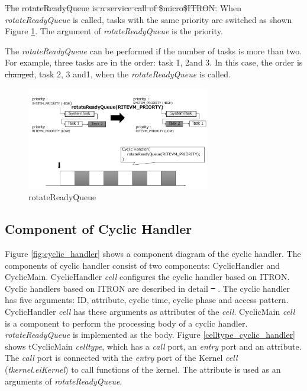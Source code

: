 \documentclass[conference,compsoc]{IEEEtran}
\providecommand{\DIFadd}[1]{{\protect\color{blue}\uwave{#1}}} %
\providecommand{\DIFdel}[1]{{\protect\color{red}\sout{#1}}}                      %
\providecommand{\DIFaddbegin}{} %
\providecommand{\DIFaddend}{} %
\providecommand{\DIFdelbegin}{} %
\providecommand{\DIFdelend}{} %
\begin{document}
\DIFdelbegin \DIFdel{The }%
\DIFdel{rotateReadyQueue}%
\DIFdel{is a service call of \$micro\$ITRON.
}\DIFdelend When {\it rotateReadyQueue} is called, tasks with the same priority are switched as shown \DIFaddbegin \DIFadd{in }\DIFaddend Figure \ref{fig:rotateReadyQueue}.
The argument of {\it rotateReadyQueue} is the priority.

The {\it rotateReadyQueue} can be performed if the number of tasks is more than two.
For example, three tasks are in the order: task 1, 2\DIFaddbegin \DIFadd{, }\DIFaddend and 3.
In this case, the order is \DIFdelbegin \DIFdel{changed}\DIFdelend \DIFaddbegin \DIFadd{rotated}\DIFaddend , task 2, 3 and\DIFaddbegin \DIFadd{, }\DIFaddend 1, when the {\it rotateReadyQueue} is called.

\begin{figure}[t]
    \centering
    \includegraphics[width=8cm,clip]{figure/rotateReadyQueue.pdf}
    \caption{rotateReadyQueue}
    \label{fig:rotateReadyQueue}
\end{figure}

\subsection{Component of Cyclic Handler}
Figure \ref{fig:cyclic_handler} shows a component diagram of the cyclic handler.
The components of cyclic handler consist of two components: CyclicHandler and CyclicMain.
CyclicHandler {\it cell} configures the cyclic handler based on \DIFaddbegin \DIFadd{$\mu$}\DIFaddend ITRON.
Cyclic handlers based on ITRON are described in detail \DIFdelbegin \DIFdel{\mbox{%
\cite{ITRON_spec}}%
}\DIFdelend \DIFaddbegin \DIFadd{\mbox{%
\cite{par:microITRON}}%
}\DIFaddend .
The cyclic handler has five arguments: ID, attribute, cyclic time, cyclic phase and access pattern.
CyclicHandler {\it cell} has these arguments as attributes of the {\it cell}.
CyclicMain {\it cell} is a component to perform the processing body of a cyclic handler.
{\it rotateReadyQueue} is implemented as the body.
Figure \ref{celltype_cyclic_handler} shows tCyclicMain {\it celltype}, which has a {\it call} port, an {\it entry} port and an attribute.
The {\it call} port is connected with the {\it entry} port of the Kernel {\it cell} ({\it tkernel.eiKernel}) to call functions of the kernel. 
The attribute is used as an arguments of {\it rotateReadyQueue}.
\end{document}
